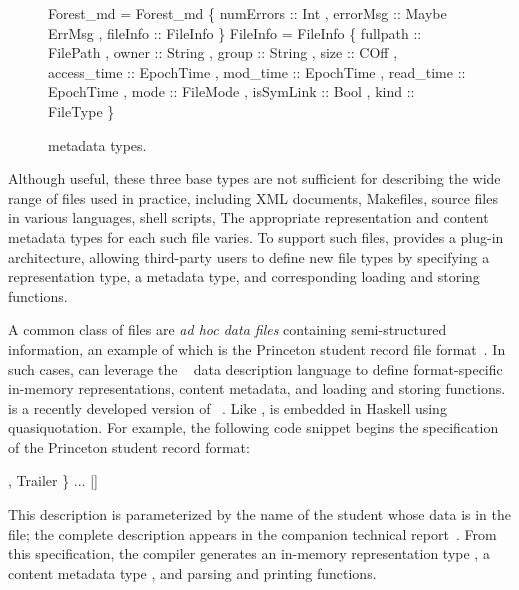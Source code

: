 \begin{figure}
\begin{centercode}
 Forest_md = Forest_md 
   \{ numErrors :: Int
   , errorMsg  :: Maybe ErrMsg
   , fileInfo  :: FileInfo \}
\mbox{}
 FileInfo = FileInfo 
   \{ fullpath    :: FilePath
   , owner       :: String
   , group       :: String
   , size        :: COff
   , access_time :: EpochTime
   , mod_time    :: EpochTime
   , read_time   :: EpochTime
   , mode        :: FileMode
   , isSymLink   :: Bool
   , kind        :: FileType \}
\end{centercode}
\caption{\forest{} metadata types.}
\label{fig:forest-md}
\end{figure}

Although useful, these three base types are not sufficient for
describing the wide range of files used in practice, including XML
documents, Makefiles, source files in various languages, shell
scripts, \etc{} The appropriate representation and content metadata
types for each such file varies. To support such files,
\forest{} provides a plug-in architecture, allowing third-party users
to define new file types by specifying a representation type, a
metadata type, and corresponding loading and storing functions.

A common class of files are \textit{ad hoc data files} containing
semi-structured information, an example of which is the Princeton
student record file format\ifanon{}~\cite{pldi-aux-materials}\fi. 
In such cases, \forest{} can leverage the \padshaskell{}~\cite{fisher-walker:icdt} data
description language to define format-specific in-memory
representations, content metadata, and loading and storing functions. 
\padshaskell{} is a recently developed version of 
\pads{}~\cite{fisher+:pads,fisher+:toplas,mandelbaum+:pads-ml}.
Like \forest{}, \padshaskell{} is embedded in Haskell using
quasiquotation.  For example, the following code snippet 
begins the \pads{} specification of the Princeton student record
format: 
\noindent
\begin{code}
[pads| \kw{data} Student(name::String) = 
            \{ person  :: Line (Person name)
            , Header  
            , courses :: [Line Course]
            , Trailer
            \} 
       ...  |]
\end{code}
This description is parameterized by the name of the student whose
data is in the file; the complete description appears in the companion
technical report~\cite{forest-techreport}.
From this specification, the \pads{} compiler
generates an in-memory representation type , a content metadata
type , and parsing and printing functions.  

